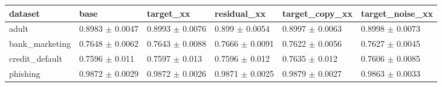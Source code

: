 \begin{tabular}{llllll}
\toprule
dataset & base & target\_xx & residual\_xx & target\_copy\_xx & target\_noise\_xx \\
\midrule
adult & 0.8983 $\pm$ 0.0047 & 0.8993 $\pm$ 0.0076 & 0.899 $\pm$ 0.0054 & 0.8997 $\pm$ 0.0063 & 0.8998 $\pm$ 0.0073 \\
bank\_marketing & 0.7648 $\pm$ 0.0062 & 0.7643 $\pm$ 0.0088 & 0.7666 $\pm$ 0.0091 & 0.7622 $\pm$ 0.0056 & 0.7627 $\pm$ 0.0045 \\
credit\_default & 0.7596 $\pm$ 0.011 & 0.7597 $\pm$ 0.013 & 0.7596 $\pm$ 0.012 & 0.7635 $\pm$ 0.012 & 0.7606 $\pm$ 0.0085 \\
phishing & 0.9872 $\pm$ 0.0029 & 0.9872 $\pm$ 0.0026 & 0.9871 $\pm$ 0.0025 & 0.9879 $\pm$ 0.0027 & 0.9863 $\pm$ 0.0033 \\
\bottomrule
\end{tabular}
